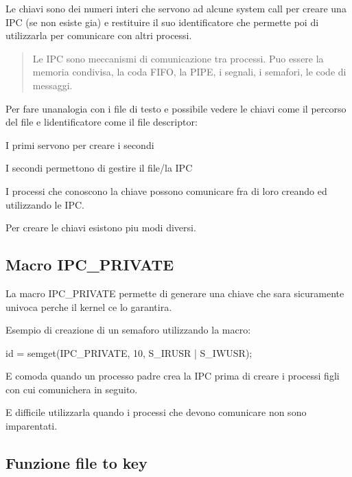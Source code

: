 Le chiavi sono dei numeri interi che servono ad alcune system call per creare una I\+PC (se non esiste gia\textquotesingle{}) e restituire il suo identificatore che permette poi di utilizzarla per comunicare con altri processi. \begin{quote}
Le I\+PC sono meccanismi di comunicazione tra processi. Puo\textquotesingle{} essere la memoria condivisa, la coda F\+I\+FO, la P\+I\+PE, i segnali, i semafori, le code di messaggi. \end{quote}


Per fare un\textquotesingle{}analogia con i file di testo e\textquotesingle{} possibile vedere le chiavi come il percorso del file e l\textquotesingle{}identificatore come il file descriptor\+:
\begin{DoxyItemize}
\item I primi servono per creare i secondi
\item I secondi permettono di gestire il file/la I\+PC
\end{DoxyItemize}

I processi che conoscono la chiave possono comunicare fra di loro creando ed utilizzando le I\+PC.

Per creare le chiavi esistono piu\textquotesingle{} modi diversi.

\subsection*{Macro I\+P\+C\+\_\+\+P\+R\+I\+V\+A\+TE}

La macro {\ttfamily I\+P\+C\+\_\+\+P\+R\+I\+V\+A\+TE} permette di generare una chiave che sara\textquotesingle{} sicuramente univoca perche\textquotesingle{} il kernel ce lo garantira\textquotesingle{}.

Esempio di creazione di un semaforo utilizzando la macro\+: 
\begin{DoxyCode}
\textcolor{keywordtype}{id} = semget(IPC\_PRIVATE, 10, S\_IRUSR | S\_IWUSR);
\end{DoxyCode}


E\textquotesingle{} comoda quando un processo padre crea la I\+PC prima di creare i processi figli con cui comunichera\textquotesingle{} in seguito.

E\textquotesingle{} difficile utilizzarla quando i processi che devono comunicare non sono imparentati.

\subsection*{Funzione file to key}

